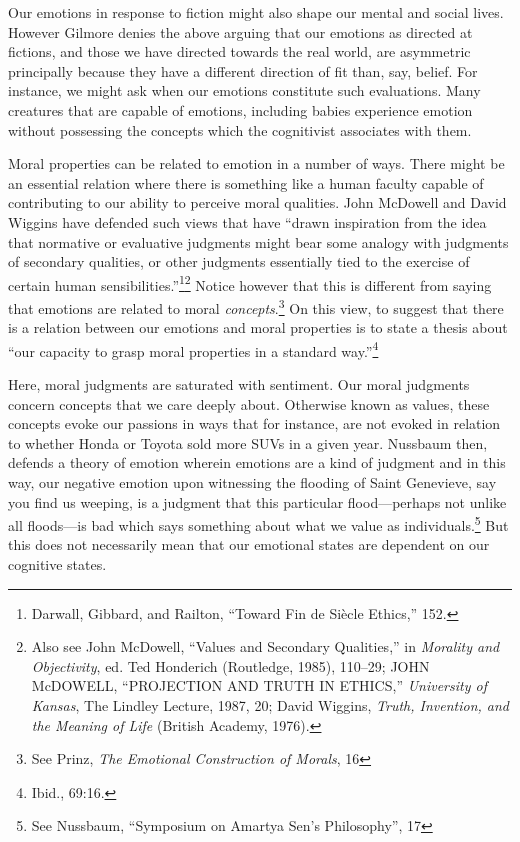 \documentclass[
  12pt,
]{book}
\theoremstyle{definition}
\theoremstyle{definition}
\theoremstyle{definition}
\theoremstyle{definition}
\theoremstyle{remark}
\begin{document}
Our emotions in response to fiction might also shape our mental and social lives. However Gilmore denies the above arguing that our emotions as directed at fictions, and those we have directed towards the real world, are asymmetric principally because they have a different direction of fit than, say, belief. For instance, we might ask when our emotions constitute such evaluations. Many creatures that are capable of emotions, including babies experience emotion without possessing the concepts which the cognitivist associates with them.

Moral properties can be related to emotion in a number of ways. There might be an essential relation where there is something like a human faculty capable of contributing to our ability to perceive moral qualities. John McDowell and David Wiggins have defended such views that have ``drawn inspiration from the idea that normative or evaluative judgments might bear some analogy with judgments of secondary qualities, or other judgments essentially tied to the exercise of certain human sensibilities.''\footnote{Darwall, Gibbard, and Railton, {``Toward Fin de Siècle Ethics,''} 152.}\footnote{Also see John McDowell, {``Values and {Secondary Qualities},''} in \emph{Morality and {Objectivity}}, ed. Ted Honderich (Routledge, 1985), 110--29; JOHN McDOWELL, {``{PROJECTION AND TRUTH IN ETHICS},''} \emph{University of Kansas}, The {Lindley Lecture}, 1987, 20; David Wiggins, \emph{Truth, {Invention}, and the {Meaning} of {Life}} (British Academy, 1976).} Notice however that this is different from saying that emotions are related to moral \emph{concepts}.\footnote{See Prinz, \emph{The {Emotional Construction} of {Morals}}, 16} On this view, to suggest that there is a relation between our emotions and moral properties is to state a thesis about ``our capacity to grasp moral properties in a standard way.''\footnote{Ibid., 69:16.}

Here, moral judgments are saturated with sentiment. Our moral judgments concern concepts that we care deeply about. Otherwise known as values, these concepts evoke our passions in ways that for instance, are not evoked in relation to whether Honda or Toyota sold more SUVs in a given year. Nussbaum then, defends a theory of emotion wherein emotions are a kind of judgment and in this way, our negative emotion upon witnessing the flooding of Saint Genevieve, say you find us weeping, is a judgment that this particular flood---perhaps not unlike all floods---is bad which says something about what we value as individuals.\footnote{See Nussbaum, {``Symposium on {Amartya Sen}'s Philosophy''}, 17} But this does not necessarily mean that our emotional states are dependent on our cognitive states.
\end{document}
